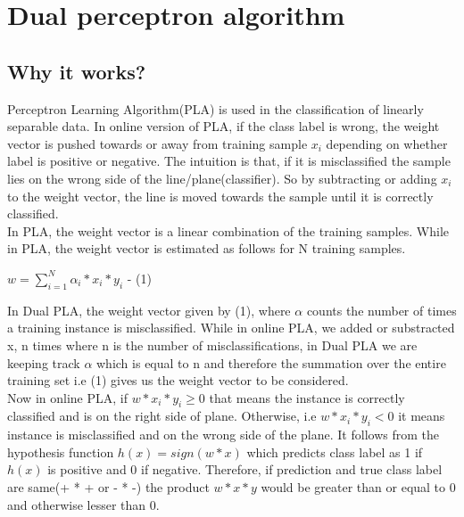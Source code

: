 \documentclass[a4paper,11pt]{article}
\begin{document}
\section*{Dual perceptron algorithm}

\subsection*{Why it works?}

Perceptron Learning Algorithm(PLA) is used in the classification of linearly separable data. In online version of PLA, if the class label is wrong, the weight vector is pushed towards or away from training sample $x_{i}$ depending on whether label is positive or negative. The intuition is that, if it is misclassified the sample lies on the wrong side of the line/plane(classifier). So by subtracting or adding $x_{i}$ to the weight vector, the line is moved towards the sample until it is correctly classified. \\

In PLA, the weight vector is a linear combination of the training samples\cite{blei}.  While in PLA, the weight vector is estimated as follows for N training samples.

\begin{center}
$w = \displaystyle\sum_{i=1}^N \alpha_{i} * x_i * y_i $  - (1)\\ 
\end{center} 

In Dual PLA, the weight vector given by (1), where $\alpha$ counts the number of times a training instance is misclassified. While in online PLA, we added or substracted x, n times where n is the number of misclassifications, in Dual PLA we are keeping track $\alpha$ which is equal to n and therefore the summation over the entire training set i.e (1) gives us the weight vector to be considered. \\

Now in online PLA, if $w * x_i * y_i \geq 0 $ that means the instance is correctly classified and is on the right side of plane. Otherwise, i.e $w * x_i * y_i < 0 $ it means instance is misclassified and on the wrong side of the plane. It follows from the hypothesis function $h(x) = sign(w*x)$ which predicts class label as 1 if $h(x)$ is positive and 0 if negative. Therefore, if prediction and true class label are same(+ * + or - * -) the product $w * x *y$ would be greater than or equal to 0 and otherwise lesser than 0.\\
\end{document}
